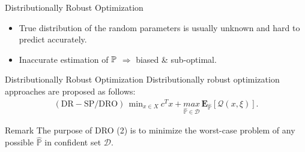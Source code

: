 \documentclass[aspectratio=169]{beamer}
\begin{document}
\begin{frame}{Distributionally Robust Optimization}
    \begin{itemize}[label=$\diamond$]
        \item True distribution of the random parameters is usually unknown and hard to predict accurately.
        \item Inaccurate estimation of $\P$ $\Rightarrow$ biased \& sub-optimal.
    \end{itemize}
        
        \begin{alertblock}{Distributionally Robust Optimization}
        Distributionally robust optimization approaches are proposed as follows:
        \begin{align}
            \mathrm{(DR-SP/DRO)}\ \ \mathrm{min}_{x\in X} \ c^Tx + \underset{\hat{\mathbb{P}}\in \mathcal{D}}{max}\,\mathbf{E}_{\hat{\mathbb{P}}}\left[\mathcal{Q}(x,\xi)\right].
        \end{align}
        \end{alertblock}
        \begin{block}{Remark}
            The purpose of DRO (2) is to minimize the worst-case problem of any possible $\hat{\mathbb{P}}$ in confident set $\mathcal{D}$.
        \end{block}
\end{frame}

%     
%     


\end{document}
